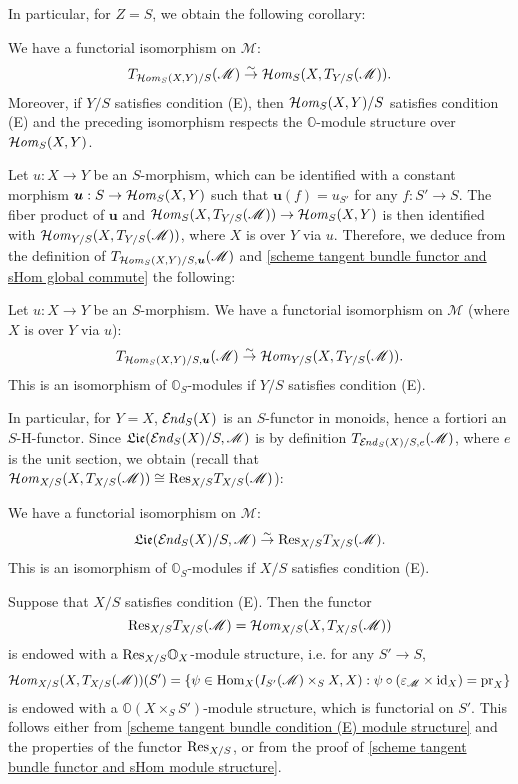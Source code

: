 In particular, for $Z=S$, we obtain the following corollary:
\begin{corollary}\label{scheme tangent bundle functor and sHom global commute}
We have a functorial isomorphism on $\mathscr{M}$:
\[T_{\operatorname{\mathcal{H}\hspace*{-0.4pt}\textit{om}\hspace{0.5pt}}_S(X,Y)/S}(\mathscr{M})\stackrel{\sim}{\to} \operatorname{\mathcal{H}\hspace*{-0.4pt}\textit{om}\hspace{0.5pt}}_S(X,T_{Y/S}(\mathscr{M})).\]
Moreover, if $Y/S$ satisfies condition (E), then $\operatorname{\mathcal{H}\hspace*{-0.4pt}\textit{om}\hspace{0.5pt}}_S(X,Y)/S$ satisfies condition (E) and the preceding isomorphism respects the $\mathbb{O}$-module structure over $\operatorname{\mathcal{H}\hspace*{-0.4pt}\textit{om}\hspace{0.5pt}}_S(X,Y)$.
\end{corollary}

Let $u:X\to Y$ be an $S$-morphism, which can be identified with a constant morphism $\bm{u}:S\to\operatorname{\mathcal{H}\hspace*{-0.4pt}\textit{om}\hspace{0.5pt}}_S(X,Y)$ such that $\bm{u}(f)=u_{S'}$ for any $f:S'\to S$. The fiber product of $\bm{u}$ and $\operatorname{\mathcal{H}\hspace*{-0.4pt}\textit{om}\hspace{0.5pt}}_S(X,T_{Y/S}(\mathscr{M}))\to\operatorname{\mathcal{H}\hspace*{-0.4pt}\textit{om}\hspace{0.5pt}}_S(X,Y)$ is then identified with $\operatorname{\mathcal{H}\hspace*{-0.4pt}\textit{om}\hspace{0.5pt}}_{Y/S}(X,T_{Y/S}(\mathscr{M}))$, where $X$ is over $Y$ via $u$. Therefore, we deduce from the definition of $T_{\operatorname{\mathcal{H}\hspace*{-0.4pt}\textit{om}\hspace{0.5pt}}_S(X,Y)/S,\bm{u}}(\mathscr{M})$ and \cref{scheme tangent bundle functor and sHom global commute} the following:

\begin{corollary}\label{scheme tangent bundle fiber and sHom commute}
Let $u:X\to Y$ be an $S$-morphism. We have a functorial isomorphism on $\mathscr{M}$ (where $X$ is over $Y$ via $u$):
\[T_{\operatorname{\mathcal{H}\hspace*{-0.4pt}\textit{om}\hspace{0.5pt}}_S(X,Y)/S,\bm{u}}(\mathscr{M})\stackrel{\sim}{\to} \operatorname{\mathcal{H}\hspace*{-0.4pt}\textit{om}\hspace{0.5pt}}_{Y/S}(X,T_{Y/S}(\mathscr{M})).\]
This is an isomorphism of $\mathbb{O}_S$-modules if $Y/S$ satisfies condition (E).
\end{corollary}

In particular, for $Y=X$, $\operatorname{\mathcal{E}\hspace*{-1pt}\textit{nd}\hspace{0.5pt}}_S(X)$ is an $S$-functor in monoids, hence a fortiori an $S$-H-functor. Since $\mathfrak{Lie}(\operatorname{\mathcal{E}\hspace*{-1pt}\textit{nd}\hspace{0.5pt}}_S(X)/S,\mathscr{M})$ is by definition $T_{\operatorname{\mathcal{E}\hspace*{-1pt}\textit{nd}\hspace{0.5pt}}_S(X)/S,e}(\mathscr{M})$, where $e$ is the unit section, we obtain (recall that $\operatorname{\mathcal{H}\hspace*{-0.4pt}\textit{om}\hspace{0.5pt}}_{X/S}(X,T_{X/S}(\mathscr{M}))\cong\mathrm{Res}_{X/S}T_{X/S}(\mathscr{M})$):

\begin{corollary}\label{scheme tangent bundle Lie and Weil restriction isomorphism}
We have a functorial isomorphism on $\mathscr{M}$:
\[\mathfrak{Lie}(\operatorname{\mathcal{E}\hspace*{-1pt}\textit{nd}\hspace{0.5pt}}_S(X)/S,\mathscr{M})\stackrel{\sim}{\to}\mathrm{Res}_{X/S}T_{X/S}(\mathscr{M}).\]
This is an isomorphism of $\mathbb{O}_S$-modules if $X/S$ satisfies condition (E).
\end{corollary}

\begin{remark}\label{scheme tangent bundle Weil restriction module structure}
Suppose that $X/S$ satisfies condition (E). Then the functor
\[\mathrm{Res}_{X/S}T_{X/S}(\mathscr{M})=\operatorname{\mathcal{H}\hspace*{-0.4pt}\textit{om}\hspace{0.5pt}}_{X/S}(X,T_{X/S}(\mathscr{M}))\]
is endowed with a $\mathrm{Res}_{X/S}\mathbb{O}_X$-module structure, i.e. for any $S'\to S$,
\[\operatorname{\mathcal{H}\hspace*{-0.4pt}\textit{om}\hspace{0.5pt}}_{X/S}(X,T_{X/S}(\mathscr{M}))(S')=\{\psi\in\mathrm{Hom}_X(I_{S'}(\mathscr{M})\times_SX,X):\psi\circ(\varepsilon_\mathscr{M}\times\operatorname{id}_X)=\mathrm{pr}_X\}\]
is endowed with a $\mathbb{O}(X\times_SS')$-module structure, which is functorial on $S'$. This follows either from \cref{scheme tangent bundle condition (E) module structure} and the properties of the functor $\mathrm{Res}_{X/S}$, or from the proof of \cref{scheme tangent bundle functor and sHom module structure}.
\end{remark}

